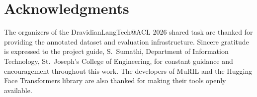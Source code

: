 \documentclass[11pt]{article}
\begin{document}
\section*{Acknowledgments}

The organizers of the DravidianLangTech@ACL 2026 shared task \cite{sivagnanam2026} are
thanked for providing the annotated dataset and
evaluation infrastructure. Sincere gratitude is
expressed to the project guide, S.~Sumathi, Department of Information Technology, St.~Joseph's
College of Engineering, for constant guidance
and encouragement throughout this work. The
developers of MuRIL and the Hugging Face
Transformers library are also thanked for making
their tools openly available.

\setlength{\bibsep}{1pt}
\small

\end{document}
